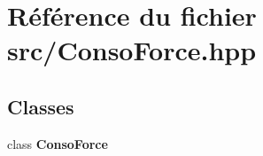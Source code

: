 \section{Référence du fichier src/\-Conso\-Force.hpp}
\label{_conso_force_8hpp}
\subsection*{Classes}
\begin{DoxyCompactItemize}
\item 
class {\bf Conso\-Force}
\end{DoxyCompactItemize}
